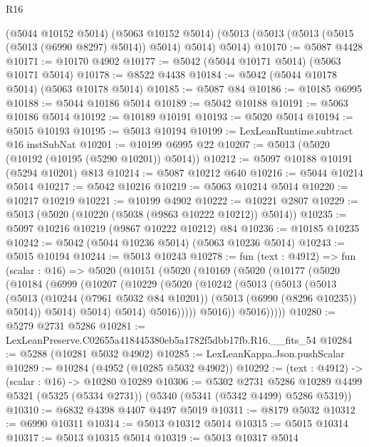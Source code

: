 \begin{lexlean}{R16}
\begin{coremodule}
    (@5044 @10152 @5014)
    (@5063 @10152 @5014)
    (@5013 (@5013 (@5013 (@5015 (@5013 (@6990 @8297) @5014)) @5014) @5014) @5014)
@10170 := @5087 @4428
@10171 := @10170 @4902
@10177 := @5042 (@5044 @10171 @5014) (@5063 @10171 @5014)
@10178 := @8522 @4438
@10184 := @5042 (@5044 @10178 @5014) (@5063 @10178 @5014)
@10185 := @5087 @84
@10186 := @10185 @6995
@10188 := @5044 @10186 @5014
@10189 := @5042 @10188
@10191 := @5063 @10186 @5014
@10192 := @10189 @10191
@10193 := @5020 @5014
@10194 := @5015 @10193
@10195 := @5013 @10194
@10199 := LexLeanRuntime.subtract @16 instSubNat
@10201 := @10199 @6995 @22
@10207 := @5013 (@5020 (@10192 (@10195 (@5290 @10201)) @5014))
@10212 := @5097 @10188 @10191 (@5294 @10201) @813
@10214 := @5087 @10212 @640
@10216 := @5044 @10214 @5014
@10217 := @5042 @10216
@10219 := @5063 @10214 @5014
@10220 := @10217 @10219
@10221 := @10199 @4902
@10222 := @10221 @2807
@10229 := @5013 (@5020 (@10220 (@5038 (@9863 @10222 @10212)) @5014))
@10235 := @5097 @10216 @10219 (@9867 @10222 @10212) @84
@10236 := @10185 @10235
@10242 := @5042 (@5044 @10236 @5014) (@5063 @10236 @5014)
@10243 := @5015 @10194
@10244 := @5013 @10243
@10278 := fun (text : @4912) =>
  fun (scalar : @16) =>
  @5020
    (@10151
      (@5020
        (@10169
          (@5020
            (@10177
              (@5020
                (@10184
                  (@6999
                    (@10207
                      (@10229
                        (@5020
                          (@10242
                            (@5013
                              (@5013
                                (@5013
                                  (@5013
                                    (@10244 (@7961 @5032 @84 @10201))
                                    (@5013 (@6990 (@8296 @10235)) @5014))
                                  @5014)
                                @5014)
                              @5014)
                            @5016)))))
                  @5016))
              @5016)))))
@10280 := @5279 @2731 @5286
@10281 := LexLeanPreserve.C02655a418445380eb5a1782f5dbb17fb.R16.__fits_54
@10284 := @5288 (@10281 @5032 @4902)
@10285 := LexLeanKappa.Json.pushScalar
@10289 := @10284 (@4952 (@10285 @5032 @4902))
@10292 := (text : @4912) -> (scalar : @16) -> @10280 @10289
@10306 := @5302
    @2731
    @5286
    @10289
    @4499
    @5321
    (@5325 (@5334 @2731))
    (@5340 (@5341 (@5342 @4499) @5286 @5319))
@10310 := @6832 @4398 @4407 @4497 @5019
@10311 := @8179 @5032
@10312 := @6990 @10311
@10314 := @5013 @10312 @5014
@10315 := @5015 @10314
@10317 := @5013 @10315 @5014
@10319 := @5013 @10317 @5014

\end{coremodule}
\end{lexlean}
